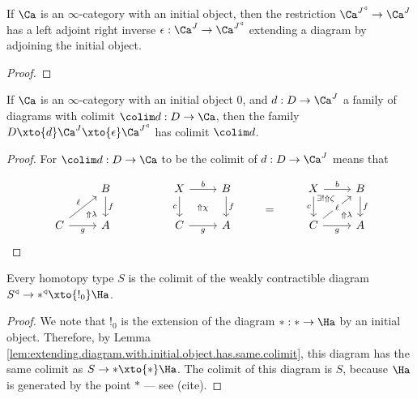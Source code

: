 \begin{lem}\label{lem:kan.extending.cone.adds.initial}
If $\Ca$ is an $\infty$-category with an initial object, then the restriction
$\Ca^{J^{\triangleleft}} \to \Ca^{J}$ has a left adjoint right inverse $\epsilon
: \Ca^J \to \Ca^{J^{\triangleleft}}$ extending a diagram by adjoining the
initial object. 
\end{lem}
\begin{proof}
\end{proof}


\begin{lem}\label{lem:extending.diagram.with.initial.object.has.same.colimit}
If $\Ca$ is an $\infty$-category with an initial object $0$, and $d : D \to
\Ca^J$ a family of diagrams with colimit $\colim d : D \to \Ca$, then the family
$D \xto{d} \Ca^J \xto{\epsilon} \Ca^{J^{\triangleleft}}$ has colimit $\colim d$.
\end{lem}
\begin{proof}
For $\colim d : D \to \Ca$ to be the colimit of $d : D \to \Ca^J$ means that

\[
\begin{tikzcd}
\arrow[dr, phantom, "\scriptstyle\Uparrow\lambda" pos=.85] & B \arrow[d, "f"] & & X \arrow[dr, phantom, "\scriptstyle\Uparrow\chi"]\arrow[r, "b"] \arrow[d, "c"'] & B \arrow[d, "f"] & \arrow[d, phantom, "="] &  X \arrow[dr, phantom, "\scriptstyle\exists!\Uparrow\zeta" pos=.1,  "\scriptstyle\Uparrow\lambda" pos=.85 ]\arrow[r, "b"] \arrow[d, "c"'] & B \arrow[d, "f"]  \\ C \arrow[r, "g"'] \arrow[ur, "\ell"] & A & & C \arrow[r, "g"'] & A &~ & C \arrow[ur, "\ell" description] \arrow[r, "g"'] & A
\end{tikzcd}
\]


\end{proof}


\begin{lem}\label{lem:every.type.weakly.contractible.colimit}
Every homotopy type $S$ is the colimit of the weakly contractible diagram
$S^{\triangleleft} \to \ast^{\triangleleft} \xto{!_0} \Ha$.
\end{lem}
\begin{proof}
We note that $!_0$ is the extension of the diagram $\ast : \ast \to \Ha$ by an
initial object. Therefore, by Lemma
\ref{lem:extending.diagram.with.initial.object.has.same.colimit}, this diagram
has the same colimit as $S \to \ast \xto{\ast} \Ha$. The colimit of this diagram
is $S$, because $\Ha$ is generated by the point $\ast$ --- see (cite). 
\end{proof}

